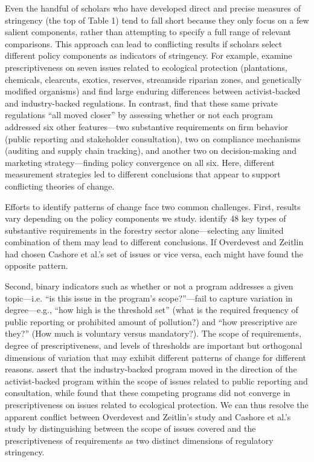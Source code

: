 \documentclass[
      12pt,
            Review ]{article}
\begin{document}
Even the handful of scholars who have developed direct and precise
measures of stringency (the top of Table 1) tend to fall short because
they only focus on a few salient components, rather than attempting to
specify a full range of relevant comparisons. This approach can lead to
conflicting results if scholars select different policy components as
indicators of stringency. For example, \citet{Cashore2004} examine
prescriptiveness on seven issues related to ecological protection
(plantations, chemicals, clearcuts, exotics, reserves, streamside
riparian zones, and genetically modified organisms) and find large
enduring differences between activist-backed and industry-backed
regulations. In contrast, \citet{Overdevest2014} find that these same
private regulations ``all moved closer'' by assessing whether or not
each program addressed six other features---two substantive requirements
on firm behavior (public reporting and stakeholder consultation), two on
compliance mechanisms (auditing and supply chain tracking), and another
two on decision-making and marketing strategy---finding policy
convergence on all six. Here, different measurement strategies led to
different conclusions that appear to support conflicting theories of
change.

Efforts to identify patterns of change face two common challenges.
First, results vary depending on the policy components we study.
\citet{McDermott2008} identify 48 key types of substantive requirements
in the forestry sector alone---selecting any limited combination of them
may lead to different conclusions. If Overdevest and Zeitlin had chosen
Cashore et al.'s set of issues or vice versa, each might have found the
opposite pattern.

Second, binary indicators such as whether or not a program addresses a
given topic---i.e. ``is this issue in the program's scope?''---fail to
capture variation in degree---e.g., ``how high is the threshold set''
(what is the required frequency of public reporting or prohibited amount
of pollution?) and ``how prescriptive are they?'' (How much is voluntary
versus mandatory?). The scope of requirements, degree of
prescriptiveness, and levels of thresholds are important but orthogonal
dimensions of variation that may exhibit different patterns of change
for different reasons. \citet{Overdevest2014} assert that the
industry-backed program moved in the direction of the activist-backed
program within the scope of issues related to public reporting and
consultation, while \citet{Cashore2004} found that these competing
programs did not converge in prescriptiveness on issues related to
ecological protection. We can thus resolve the apparent conflict between
Overdevest and Zeitlin's study and Cashore et al.'s study by
distinguishing between the scope of issues covered and the
prescriptiveness of requirements as two distinct dimensions of
regulatory stringency.
\end{document}

